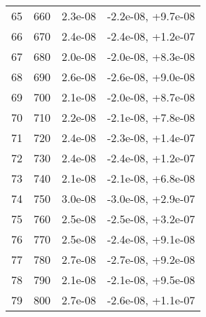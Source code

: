 \begin{table}
\begin{adjustbox}{width=1\textwidth/2}
\begin{tabular}{|c|c|c|c|}
\cline{1-4}
65 & 660 & 2.3e-08 & -2.2e-08, +9.7e-08 \\
\cline{1-4}
66 & 670 & 2.4e-08 & -2.4e-08, +1.2e-07 \\
\cline{1-4}
67 & 680 & 2.0e-08 & -2.0e-08, +8.3e-08 \\
\cline{1-4}
68 & 690 & 2.6e-08 & -2.6e-08, +9.0e-08 \\
\cline{1-4}
69 & 700 & 2.1e-08 & -2.0e-08, +8.7e-08 \\
\cline{1-4}
70 & 710 & 2.2e-08 & -2.1e-08, +7.8e-08 \\
\cline{1-4}
71 & 720 & 2.4e-08 & -2.3e-08, +1.4e-07 \\
\cline{1-4}
72 & 730 & 2.4e-08 & -2.4e-08, +1.2e-07 \\
\cline{1-4}
73 & 740 & 2.1e-08 & -2.1e-08, +6.8e-08 \\
\cline{1-4}
74 & 750 & 3.0e-08 & -3.0e-08, +2.9e-07 \\
\cline{1-4}
75 & 760 & 2.5e-08 & -2.5e-08, +3.2e-07 \\
\cline{1-4}
76 & 770 & 2.5e-08 & -2.4e-08, +9.1e-08 \\
\cline{1-4}
77 & 780 & 2.7e-08 & -2.7e-08, +9.2e-08 \\
\cline{1-4}
78 & 790 & 2.1e-08 & -2.1e-08, +9.5e-08 \\
\cline{1-4}
79 & 800 & 2.7e-08 & -2.6e-08, +1.1e-07 \\
\cline{1-4}
\end{tabular}
\end{adjustbox}
\end{table}

